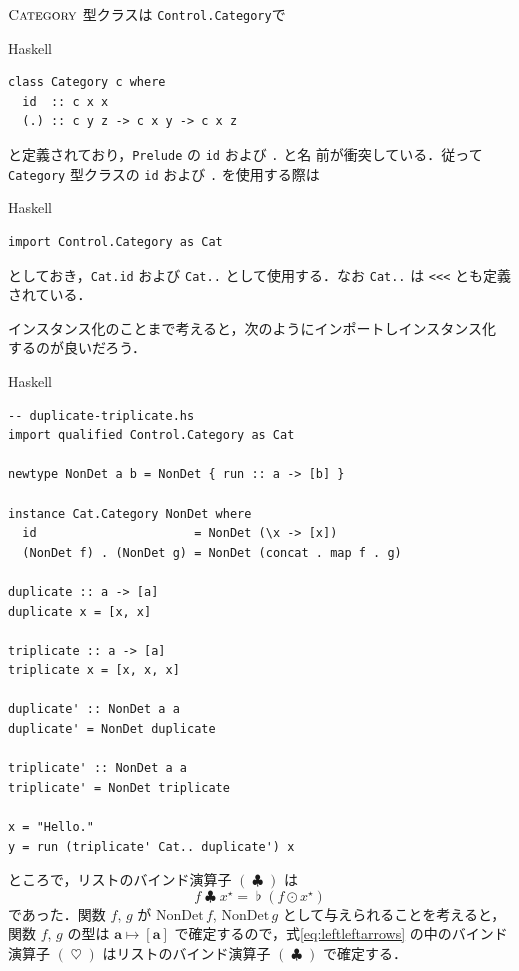\documentclass[a5paper,twoside,fleqn,draft]{jsbook}
\newcommand{\programminglanguage}[1]{\textsf{#1}}
\newcommand{\haskell}{\programminglanguage{Haskell}}
\newcommand{\code}[1]{\texttt{#1}}
\newcommand{\filename}[1]{\texttt{#1}}
\newenvironment{haskellcode}{\begin{itembox}[r]{\haskell}}{\end{itembox}}
\DeclareMathOperator{\mBind}{\heartsuit}
\DeclareMathOperator{\mBindList}{\clubsuit}
\DeclareMathOperator{\mJoinList}{\flat} %
\DeclareMathOperator{\mMapList}{\odot}
\DeclareMathOperator{\mMapsTo}{\mapsto}
\newcommand{\mType}[1]{\mathbf{#1}} %
\newcommand{\mA}{\mType{a}}
\newcommand{\mValueConstructor}[1]{\mathrm{#1}}
\newcommand{\mValueWith}[2]{\mValueConstructor{#1}\,#2}
\newcommand{\mTypeClass}[1]{\textsc{#1}} %
\newcommand{\mCategoryTypeClass}{\mTypeClass{Category}}
\newcommand{\mList}[1]{{#1}^\mathrm{\star}}
\begin{document}
$\mCategoryTypeClass$ 型クラスは \filename{Control.Category}で
\begin{haskellcode}
\begin{verbatim}
class Category c where
  id  :: c x x
  (.) :: c y z -> c x y -> c x z
\end{verbatim}
\end{haskellcode}
と定義されており，\filename{Prelude} の \code{id} および \code{.} と名
前が衝突している．従って \code{Category} 型クラスの \code{id} および
\code{.} を使用する際は
\begin{haskellcode}
\begin{verbatim}
import Control.Category as Cat
\end{verbatim}
\end{haskellcode}
としておき，\code{Cat.id} および \code{Cat..} として使用する．なお
\code{Cat..} は \code{<<<} とも定義されている．

インスタンス化のことまで考えると，次のようにインポートしインスタンス化
するのが良いだろう．
\begin{haskellcode}
\begin{verbatim}
-- duplicate-triplicate.hs
import qualified Control.Category as Cat

newtype NonDet a b = NonDet { run :: a -> [b] }

instance Cat.Category NonDet where
  id                      = NonDet (\x -> [x])
  (NonDet f) . (NonDet g) = NonDet (concat . map f . g)

duplicate :: a -> [a]
duplicate x = [x, x]

triplicate :: a -> [a]
triplicate x = [x, x, x]

duplicate' :: NonDet a a
duplicate' = NonDet duplicate

triplicate' :: NonDet a a
triplicate' = NonDet triplicate

x = "Hello."
y = run (triplicate' Cat.. duplicate') x
\end{verbatim}
\end{haskellcode}

ところで，リストのバインド演算子 $(\mBindList)$ は
\begin{equation}
  f\mBindList\mList{x}
  =\mJoinList(f\mMapList\mList{x})
\end{equation}
であった．関数 $f$, $g$ が $\mValueWith{NonDet}{f}$,
$\mValueWith{NonDet}{g}$ として与えられることを考えると，関数 $f$, $g$
の型は $\mA\mMapsTo[\mA]$ で確定するので，式\eqref{eq:leftleftarrows}
の中のバインド演算子 $(\mBind)$ はリストのバインド演算子
$(\mBindList)$ で確定する．
\end{document}
